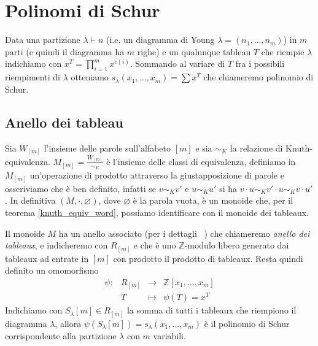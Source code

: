 \chapter{Polinomi di Schur}

\begin{defn}
Data una partizione $\lambda \vdash n$ (i.e. un diagramma di Young
$\lambda = (n_1, \ldots, n_m)$) in $m$ parti (e quindi il diagramma ha
$m$ righe) e un qualunque tableau $T$ che riempie $\lambda$ indichiamo
con $x^T = \prod\limits_{i = 1}^m x^{c(i)}$. Sommando al variare di
$T$ fra i possibili riempimenti di $\lambda$ otteniamo
\begin{math}
s_\lambda(x_1,\ldots,x_m) = \sum x^T
\end{math}
che chiameremo polinomio di Schur.
\end{defn}

\section{Anello dei tableau}

Sia $W_{[m]}$ l'insieme delle parole sull'alfabeto $[m]$ e sia
$\sim_K$ la relazione di Knuth-equivalenza. $M_{[m]} =
\frac{W_{[m]}}{\sim_K}$ \`e l'insieme delle classi di equivalenza,
definiamo in $M_{[m]}$ un'operazione di prodotto attraverso la giustapposizione di parole e
osseriviamo che \`e ben definito, infatti se $v \sim_K v'$ e $u \sim_K
u'$ si ha $v \cdot u \sim_K v' \cdot u \sim_K v \cdot u'$. In
definitiva $(M, \cdot, \varnothing)$, dove $\varnothing$ \`e la
parola vuota, \`e un monoide che, per il
teorema \ref{knuth_equiv_word}, possiamo identificare con il monoide
dei tableaux.

Il monoide $M$ ha un anello associato (per i dettagli ~\cite{lang2002algebra}) che chiameremo \emph{anello dei tableaux}, e indicheremo con
$R_{[m]}$ e che \`e uno $\mathbb{Z}$-modulo libero generato dai
tableaux ad entrate in $[m]$ con prodotto il prodotto di tableaux.
Resta quindi definito un omomorfismo
\begin{equation}
\begin{matrix}\label{ring_tab}
\psi: & R_{[m]} & \rightarrow  & \mathbb{Z}[x_1,\ldots,x_m]\\
& T      & \mapsto & \psi(T)=x^T
\end{matrix}
\end{equation}
Indichiamo con $S_\lambda[m] \in R_{[m]}$ la somma di tutti i tableaux
che riempiono il diagramma $\lambda$, allora
$\psi(S_\lambda[m])=s_\lambda(x_1,\ldots,x_m)$ \`e il polinomio di
Schur corrispondente alla partizione $\lambda$ con $m$ variabili.

